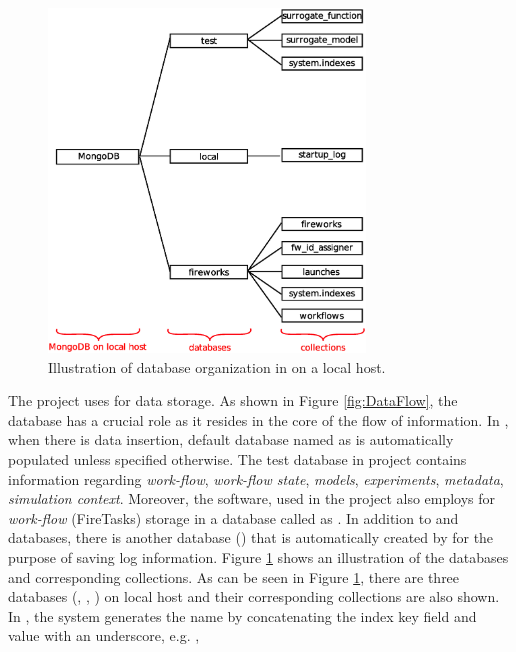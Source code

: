 \begin{figure}
  \centering
  \includegraphics[width=0.75\textwidth,keepaspectratio=true]{./Content/Figures/mongodb_on_local_host.eps}
  \caption{Illustration of database organization in {\MongoDB} on a local host.}
  \label{fig:MongoDBlocal}
\end{figure}
%
The {\MoDeNa} project uses {\MongoDB} for data storage.  As shown in Figure
\ref{fig:DataFlow}, the database has a crucial role as it resides in the core of
the flow of information.  In {\MongoDB}, when there is data insertion, default
database named as {\tst} is automatically populated unless specified otherwise.
The test database in {\MoDeNa} project contains information regarding
\emph{work-flow}, \emph{work-flow state}, \emph{models}, \emph{experiments},
\emph{metadata}, \emph{simulation context}.  Moreover, the software,
{\Fireworks} used in the project also employs {\MongoDB} for \emph{work-flow}
(FireTasks) storage in a database called as {\fireworks}.  In addition to {\tst}
and {\fireworks} databases, there is another database ({\lcl}) that is
automatically created by {\MongoDB} for the purpose of saving log information.
Figure \ref{fig:MongoDBlocal} shows an illustration of the {\MongoDB} databases
and corresponding collections.
%
As can be seen in Figure \ref{fig:MongoDBlocal}, there are three {\MongoDB}
databases ({\tst}, {\lcl}, {\fireworks}) on local host and their corresponding
collections are also shown.  In {\MongoDB}, the system generates the name by
concatenating the index key field and value with an underscore, e.g. {\catOne},
